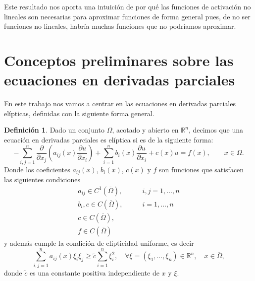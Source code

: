 \documentclass[a4paper,11pt,spanish, twoside, leqno]{tfg-uam}
\theoremstyle{definition}
\newtheorem{defin}[teor]{Definici\'on}
\begin{document}
Este resultado nos aporta una intuición de por qué las funciones de activación no lineales son necesarias para aproximar funciones de forma general pues, de no ser funciones no lineales, habría muchas funciones que no podríamos aproximar. 

\section{Conceptos preliminares sobre las ecuaciones en derivadas parciales} \label{sec:EDPs}

En este trabajo nos vamos a centrar en las ecuaciones en derivadas parciales elípticas, definidas con la siguiente forma general.

\begin{mdframed}
\begin{defin}\label{def:EDP_eliptica}
    Dado un conjunto $\Omega$, acotado y abierto en $\mathbb{R}^n$, decimos que una ecuación en derivadas parciales es elíptica si es de la siguiente forma:
    \begin{equation}\label{eq:EDP_eliptica}
        -\sum_{i,j=1}^{n} \frac{\partial}{\partial x_j}\left( a_{ij}(x)\frac{\partial u}{\partial x_i}\right) + \sum_{i=1}^{n} b_i(x)\frac{\partial u}{\partial x_i} + c(x)u = f(x), \qquad x\in\Omega.
    \end{equation}
    Donde los coeficientes $a_{ij}(x)$, $b_i(x)$, $c(x)$ y $f$ son funciones que satisfacen las siguientes condiciones
    \begin{align}
        a_{ij} \in C^1(\overline{\Omega}),& \qquad i,j = 1, \dots ,n \label{eq:condiciones_EDP_eliptica_a} \\
        b_i, c \in C(\overline{\Omega}),& \qquad i = 1, \dots ,n \\
        c \in C(\overline{\Omega}),& \\
        f\in C(\overline{\Omega})&\label{eq:condiciones_EDP_eliptica_f}
    \end{align}
    y además cumple la condición de elipticidad uniforme, es decir
    \begin{equation}\label{eq:condiciones_EDP_eliptica_elipticidad_uniforme}
        \sum_{i,j=1}^n a_{ij}(x) \xi_i \xi_j \geq \tilde{c} \sum_{i=1}^n \xi_i^2, \quad \forall \xi = (\xi_1, \ldots, \xi_n) \in \mathbb{R}^n, \quad x \in \overline{\Omega},
    \end{equation}
    donde $\tilde{c}$ es una constante positiva independiente de $x$ y $\xi$.
\end{defin}
\end{mdframed}
\end{document}
